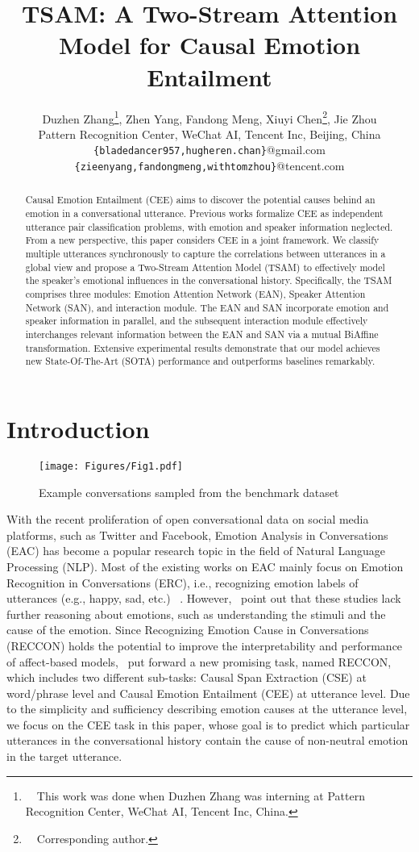 \documentclass[11pt]{article}
\title{TSAM: A Two-Stream Attention Model for Causal Emotion Entailment}
\author{Duzhen Zhang\thanks{\ \ This work was done when Duzhen Zhang was interning at Pattern Recognition Center, WeChat AI, Tencent Inc, China.}, Zhen Yang, Fandong Meng, Xiuyi Chen\thanks{\ \ Corresponding author.}, Jie Zhou\\
        Pattern Recognition Center, WeChat AI, Tencent Inc, Beijing, China\\
        \texttt{\{bladedancer957,hugheren.chan\}}@gmail.com\\
        \texttt{\{zieenyang,fandongmeng,withtomzhou\}}@tencent.com
        }
\begin{document}
\maketitle
\begin{abstract}
Causal Emotion Entailment (CEE) aims to discover the potential causes behind an emotion in a conversational utterance. Previous works formalize CEE as independent utterance pair classification problems, with emotion and speaker information neglected.
From a new perspective, this paper considers CEE in a joint framework. We classify multiple utterances synchronously to capture the correlations between utterances in a global view and propose a Two-Stream Attention Model (TSAM) to effectively model the speaker's emotional influences in the conversational history.
Specifically, the TSAM comprises three modules: Emotion Attention Network (EAN), Speaker Attention Network (SAN), and interaction module. The EAN and SAN incorporate emotion and speaker information in parallel, and the subsequent interaction module effectively interchanges relevant information between the EAN and SAN via a mutual BiAffine transformation.
Extensive experimental results demonstrate that our model achieves new State-Of-The-Art (SOTA) performance and outperforms baselines remarkably.
\end{abstract}

\section{Introduction}

\begin{figure}[htbp]
	\centering  \texttt{[image: Figures/Fig1.pdf]}
\caption{Example conversations sampled from the benchmark dataset~\citep{poria2021recognizing}}\label{fig-1}
\end{figure}
With the recent proliferation of open conversational data on social media platforms, such as Twitter and Facebook, Emotion Analysis in Conversations (EAC) has become a popular research topic in the field of Natural Language Processing (NLP). Most of the existing works on EAC mainly focus on Emotion Recognition in Conversations (ERC), i.e., recognizing emotion labels of utterances (e.g., happy, sad, etc.) ~\citep{poria2017context,poria2019emotion,wang2020contextualized,zhang2020knowledge}. However,~\citet{poria2021recognizing} point out that these studies lack further reasoning about emotions, such as understanding the stimuli and the cause of the emotion. Since Recognizing Emotion Cause in Conversations (RECCON) holds the potential to improve the interpretability and performance of affect-based models,~\citet{poria2021recognizing} put forward a new promising task, named RECCON, which includes two different sub-tasks: Causal Span Extraction (CSE) at word/phrase level and Causal Emotion Entailment (CEE) at utterance level. Due to the simplicity and sufficiency describing emotion causes at the utterance level, we focus on the CEE task in this paper, whose goal is to predict which particular utterances in the conversational history contain the cause of non-neutral emotion in the target utterance. 
\end{document}
